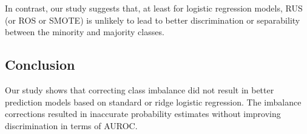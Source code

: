 	In contrast, our study suggests that, at least for logistic regression models, 
	RUS (or ROS or SMOTE) is unlikely to lead to better discrimination or separability between the minority and majority classes.
	
\subsection{Conclusion}	
	Our study shows that correcting class imbalance did not result in better prediction models based on standard or ridge logistic regression. 
	The imbalance corrections resulted in inaccurate probability estimates without improving discrimination in terms of AUROC.
	
	